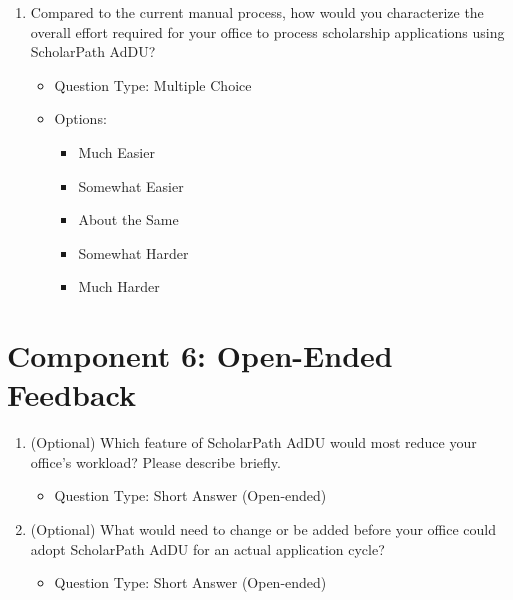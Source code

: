 \begin{enumerate}[resume=q, label={Question \arabic*:}, leftmargin=*, align=left]
  \item Compared to the current manual process, how would you characterize the overall effort required for your office to process scholarship applications using ScholarPath AdDU?
  \begin{itemize}[leftmargin=*]
    \item Question Type: Multiple Choice
    \item Options:
    \begin{itemize}[leftmargin=*]
      \item Much Easier
      \item Somewhat Easier
      \item About the Same
      \item Somewhat Harder
      \item Much Harder
    \end{itemize}
  \end{itemize}
\end{enumerate}

\section{Component 6: Open-Ended Feedback}

\begin{enumerate}[resume=q, label={Question \arabic*:}, leftmargin=*, align=left]
  \item (Optional) Which feature of ScholarPath AdDU would most reduce your office's workload? Please describe briefly.
  \begin{itemize}[leftmargin=*]
    \item Question Type: Short Answer (Open-ended)
  \end{itemize}
  \item (Optional) What would need to change or be added before your office could adopt ScholarPath AdDU for an actual application cycle?
  \begin{itemize}[leftmargin=*]
    \item Question Type: Short Answer (Open-ended)
  \end{itemize}
\end{enumerate}
